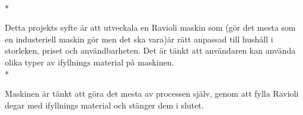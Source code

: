 \\*

Detta projekts syfte är att utveckala en Ravioli maskin som (gör det mesta som en industeriell maskin gör men det ska vara)är rätt anpassad till hushåll i storleken, priset och användbarheten. Det är tänkt att användaren kan använda olika typer av ifyllnings material på maskinen.\\*

Maskinen är tänkt att göra det mesta av processen själv, genom att fylla Ravioli degar med ifyllnings material och stänger dem i slutet.

